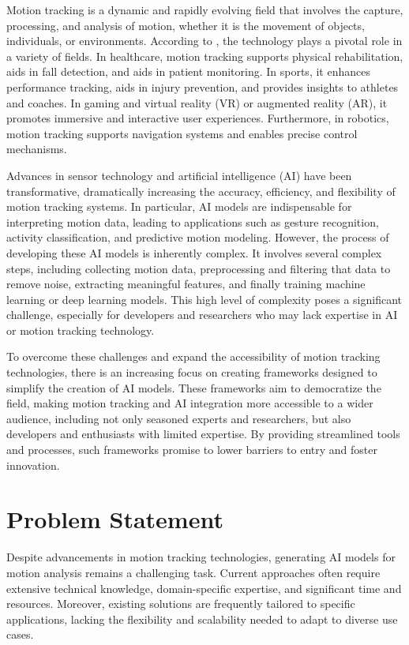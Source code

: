 Motion tracking is a dynamic and rapidly evolving field that involves the capture, processing, and analysis of motion, whether it is the movement of objects, individuals, or environments. According to \cite{article:human_motion_tracking_survey}, the technology plays a pivotal role in a variety of fields. In healthcare, motion tracking supports physical rehabilitation, aids in fall detection, and aids in patient monitoring. In sports, it enhances performance tracking, aids in injury prevention, and provides insights to athletes and coaches. In gaming and virtual reality (VR) or augmented reality (AR), it promotes immersive and interactive user experiences. Furthermore, in robotics, motion tracking supports navigation systems and enables precise control mechanisms.

Advances in sensor technology and artificial intelligence (AI) have been transformative, dramatically increasing the accuracy, efficiency, and flexibility of motion tracking systems. In particular, AI models are indispensable for interpreting motion data, leading to applications such as gesture recognition, activity classification, and predictive motion modeling. However, the process of developing these AI models is inherently complex. It involves several complex steps, including collecting motion data, preprocessing and filtering that data to remove noise, extracting meaningful features, and finally training machine learning or deep learning models. This high level of complexity poses a significant challenge, especially for developers and researchers who may lack expertise in AI or motion tracking technology.

To overcome these challenges and expand the accessibility of motion tracking technologies, there is an increasing focus on creating frameworks designed to simplify the creation of AI models. These frameworks aim to democratize the field, making motion tracking and AI integration more accessible to a wider audience, including not only seasoned experts and researchers, but also developers and enthusiasts with limited expertise. By providing streamlined tools and processes, such frameworks promise to lower barriers to entry and foster innovation.

\section{Problem Statement}
Despite advancements in motion tracking technologies, generating AI models for motion analysis remains a challenging task. Current approaches often require extensive technical knowledge, domain-specific expertise, and significant time and resources. Moreover, existing solutions are frequently tailored to specific applications, lacking the flexibility and scalability needed to adapt to diverse use cases.

